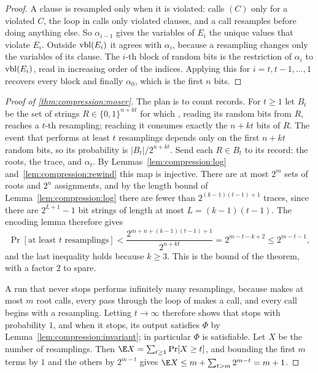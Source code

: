 \begin{refsection}
\begin{proof}
A clause is resampled only when it is violated: \compressionSolve{} calls \compressionFix$(C)$ only for a violated $C$, the loop in \compressionFix{} calls only violated clauses, and a call resamples before doing anything else. So $\alpha_{i-1}$ gives the variables of $E_i$ the unique values that violate $E_i$. Outside $\operatorname{vbl}(E_i)$ it agrees with $\alpha_i$, because a resampling changes only the variables of its clause. The $i$-th block of random bits is the restriction of $\alpha_i$ to $\operatorname{vbl}(E_i)$, read in increasing order of the indices. Applying this for $i=t,t-1,\dots,1$ recovers every block and finally $\alpha_0$, which is the first $n$ bits.
\end{proof}

\begin{proof}[Proof of \cref{thm:compression:moser}]
The plan is to count records. For $t\ge1$ let $B_t$ be the set of strings $R\in\{0,1\}^{n+kt}$ for which \compressionSolve, reading its random bits from $R$, reaches a $t$-th resampling; reaching it consumes exactly the $n+kt$ bits of $R$. The event that \compressionSolve{} performs at least $t$ resamplings depends only on the first $n+kt$ random bits, so its probability is $|B_t|/2^{n+kt}$. Send each $R\in B_t$ to its record: the roots, the trace, and $\alpha_t$. By Lemmas~\ref{lem:compression:log} and~\ref{lem:compression:rewind} this map is injective. There are at most $2^m$ sets of roots and $2^n$ assignments, and by the length bound of Lemma~\ref{lem:compression:log} there are fewer than $2^{(k-1)(t-1)+1}$ traces, since there are $2^{L+1}-1$ bit strings of length at most $L=(k-1)(t-1)$. The encoding lemma therefore gives
\[
\Pr[\text{at least $t$ resamplings}]<\frac{2^{m+n+(k-1)(t-1)+1}}{2^{n+kt}}=2^{m-t-k+2}\le2^{m-t-1},
\]
and the last inequality holds because $k\ge3$. This is the bound of the theorem, with a factor $2$ to spare.

A run that never stops performs infinitely many resamplings, because \compressionSolve{} makes at most $m$ root calls, every pass through the loop of \compressionFix{} makes a call, and every call begins with a resampling. Letting $t\to\infty$ therefore shows that \compressionSolve{} stops with probability $1$, and when it stops, its output satisfies $\Phi$ by Lemma~\ref{lem:compression:invariant}; in particular $\Phi$ is satisfiable. Let $X$ be the number of resamplings. Then $\E X=\sum_{t\ge1}\Pr[X\ge t]$, and bounding the first $m$ terms by $1$ and the others by $2^{m-t}$ gives $\E X\le m+\sum_{t>m}2^{m-t}=m+1$.
\end{proof}


\end{refsection}
